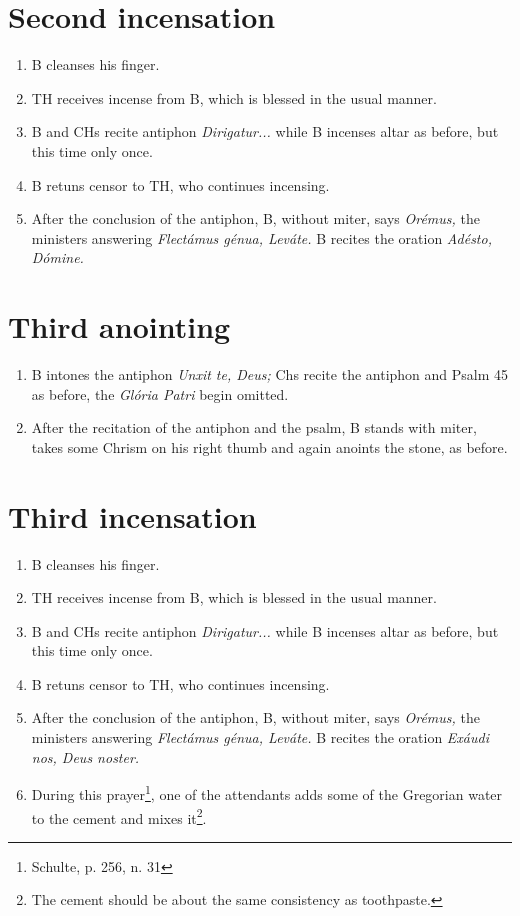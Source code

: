 \documentclass[letterpaper]{report}
\begin{document}
{\section{Second incensation}
\begin{enumerate}
	\item B cleanses his finger.
	\item TH receives incense from B, which is blessed in the usual manner.
	\item B and CHs recite antiphon \textit{Dirigatur...} while B incenses altar as before, but this time only once.
	\item B retuns censor to TH, who continues incensing.
	\item After the conclusion of the antiphon, B, without miter, says \textit{Orémus,} the ministers answering \textit{Flectámus génua, Leváte.} B recites the oration \textit{Adésto, Dómine.}
\end{enumerate}
\section{Third anointing}
\begin{enumerate}
	\item B intones the antiphon \textit{Unxit te, Deus;} Chs recite the antiphon and Psalm 45 as before, the \textit{Glória Patri} begin omitted.
	\item After the recitation of the antiphon and the psalm, B stands with miter, takes some Chrism on his right thumb and again anoints the stone, as before.
\end{enumerate}
\section{Third incensation}
\begin{enumerate}
	\item B cleanses his finger.
	\item TH receives incense from B, which is blessed in the usual manner.
	\item B and CHs recite antiphon \textit{Dirigatur...} while B incenses altar as before, but this time only once.
	\item B retuns censor to TH, who continues incensing.
	\item After the conclusion of the antiphon, B, without miter, says \textit{Orémus,} the ministers answering \textit{Flectámus génua, Leváte.} B recites the oration \textit{Exáudi nos, Deus noster.}
	\item During this prayer\footnote{Schulte, p. 256, n. 31}, one of the attendants adds some of the Gregorian water to the cement and mixes it\footnote{The cement should be about the same consistency as toothpaste.}.
\end{enumerate}
}
\end{document}
